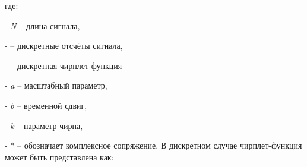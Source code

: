 где:


- \emph{N} -- длина сигнала,

- 
-- дискретные отсчёты сигнала,

- 
-- дискретная чирплет-функция

- \emph{a} -- масштабный параметр,

- \emph{b} -- временной сдвиг,

- \emph{k} -- параметр чирпа,

- * -- обозначает комплексное сопряжение.
В дискретном случае чирплет-функция может быть представлена как:


